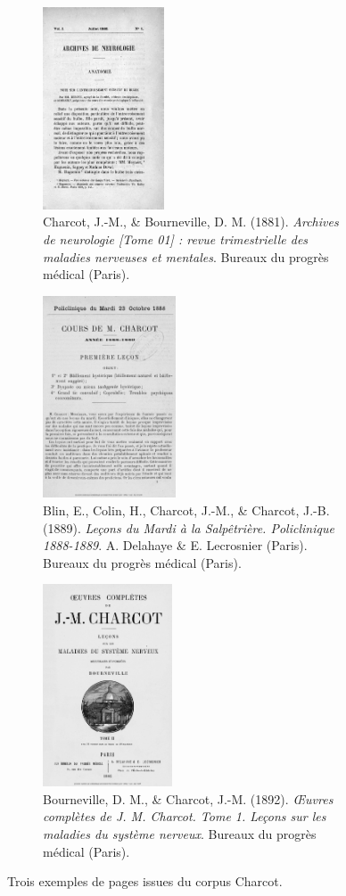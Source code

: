 \begin{figure}[htp]
	\centering
	
	\begin{subfigure}[t]{0.3\textwidth}
		\centering
		\includegraphics[height=6cm]{img/archives_neurologie.jpg}
		\caption{Charcot, J.-M., \& Bourneville, D. M. (1881). \textit{Archives de neurologie [Tome 01] : revue trimestrielle des maladies nerveuses et mentales}. Bureaux du progrès médical (Paris).}
	\end{subfigure}\hfill
	\begin{subfigure}[t]{0.3\textwidth}
		\centering
		\includegraphics[height=6cm]{img/lecons.jpg}
		\caption{Blin, E., Colin, H., Charcot, J.-M., \& Charcot, J.-B. (1889). \textit{Leçons du Mardi à la Salpêtrière. Policlinique 1888-1889}. A. Delahaye \& E. Lecrosnier (Paris). Bureaux du progrès médical (Paris).}
	\end{subfigure}
	\hfill
		\begin{subfigure}[t]{0.3\textwidth}
		\centering
		\includegraphics[height=6cm]{img/oeuvres_completes.jpg}
		\caption{Bourneville, D. M., \& Charcot, J.-M. (1892). \textit{\OE{}uvres complètes de J. M. Charcot. Tome 1. Leçons sur les maladies du système nerveux}. Bureaux du progrès médical (Paris).}
	\end{subfigure}
	\caption{Trois exemples de pages issues du corpus Charcot.}
	\label{fig:charcot_pages}
\end{figure}


